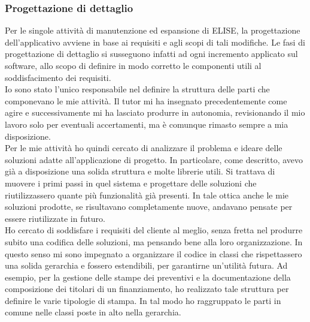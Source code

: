 	\subsubsection{Progettazione di dettaglio}
	
	Per le singole attività di manutenzione ed espansione di ELISE, la progettazione dell'applicativo avviene in base ai requisiti e agli scopi di tali modifiche. Le fasi di progettazione di dettaglio si susseguono infatti ad ogni incremento applicato sul software, allo scopo di definire in modo corretto le componenti utili al soddisfacimento dei requisiti. \\
	
	Io sono stato l'unico responsabile nel definire la struttura delle parti che componevano le mie attività. Il tutor mi ha insegnato precedentemente come agire e successivamente mi ha lasciato produrre in autonomia, revisionando il mio lavoro solo per eventuali accertamenti, ma è comunque rimasto sempre a mia disposizione.\\
	
	Per le mie attività ho quindi cercato di analizzare il problema e ideare delle soluzioni adatte all'applicazione di progetto. In particolare, come descritto, avevo già a disposizione una solida struttura e molte librerie utili. Si trattava di muovere i primi passi in quel sistema e progettare delle soluzioni che riutilizzassero quante più funzionalità già presenti. In tale ottica anche le mie soluzioni prodotte, se risultavano completamente nuove, andavano pensate per essere riutilizzate in futuro.\\
	
	Ho cercato di soddisfare i requisiti del cliente al meglio, senza fretta nel produrre subito una codifica delle soluzioni, ma pensando bene alla loro organizzazione. In questo senso mi sono impegnato a organizzare il codice in classi che rispettassero una solida gerarchia e fossero estendibili, per garantirne un'utilità futura. Ad esempio, per la gestione delle stampe dei preventivi e la documentazione della composizione dei titolari di un finanziamento, ho realizzato tale struttura per definire le varie tipologie di stampa. In tal modo ho raggruppato le parti in comune nelle classi poste in alto nella gerarchia.
	
